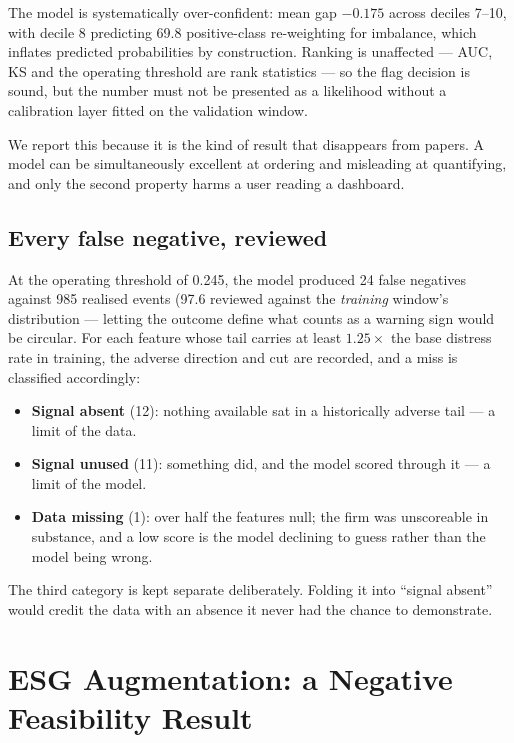 \documentclass[conference]{IEEEtran}
\begin{document}
The model is systematically over-confident: mean gap $-0.175$ across deciles
7--10, with decile 8 predicting 69.8%
positive-class re-weighting for imbalance, which inflates predicted
probabilities by construction. Ranking is unaffected --- AUC, KS and the
operating threshold are rank statistics --- so the flag decision is sound, but
the number must not be presented as a likelihood without a calibration layer
fitted on the validation window.

We report this because it is the kind of result that disappears from papers.
A model can be simultaneously excellent at ordering and misleading at
quantifying, and only the second property harms a user reading a dashboard.

\subsection{Every false negative, reviewed}
At the operating threshold of 0.245, the model produced 24 false
negatives against 985 realised events (97.6%
reviewed against the \emph{training} window's distribution --- letting the
outcome define what counts as a warning sign would be circular. For each
feature whose tail carries at least $1.25\times$ the base distress rate in
training, the adverse direction and cut are recorded, and a miss is classified
accordingly:

\begin{itemize}
\item \textbf{Signal absent} (12): nothing available sat in a
      historically adverse tail --- a limit of the data.
\item \textbf{Signal unused} (11): something did, and the model scored
      through it --- a limit of the model.
\item \textbf{Data missing} (1): over half the features null; the firm
      was unscoreable in substance, and a low score is the model declining to
      guess rather than the model being wrong.
\end{itemize}

The third category is kept separate deliberately. Folding it into ``signal
absent'' would credit the data with an absence it never had the chance to
demonstrate.

\section{ESG Augmentation: a Negative Feasibility Result}
\end{document}

